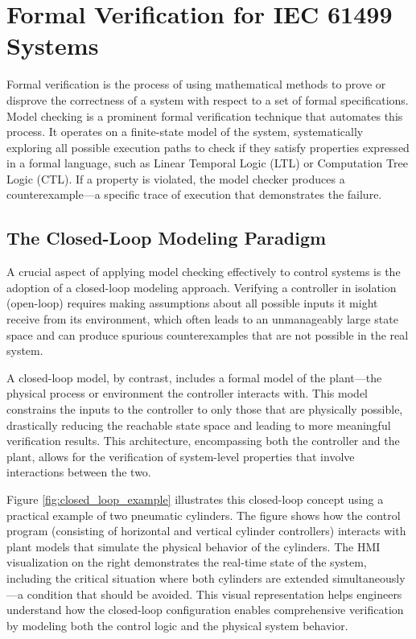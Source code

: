 \section{Formal Verification for IEC 61499 Systems}\label{sec:formal_verification}

Formal verification is the process of using mathematical methods to prove or disprove the correctness of a system with respect to a set of formal specifications. Model checking is a prominent formal verification technique that automates this process. It operates on a finite-state model of the system, systematically exploring all possible execution paths to check if they satisfy properties expressed in a formal language, such as Linear Temporal Logic (LTL) or Computation Tree Logic (CTL). If a property is violated, the model checker produces a counterexample—a specific trace of execution that demonstrates the failure.

\subsection{The Closed-Loop Modeling Paradigm}

A crucial aspect of applying model checking effectively to control systems is the adoption of a closed-loop modeling approach. Verifying a controller in isolation (open-loop) requires making assumptions about all possible inputs it might receive from its environment, which often leads to an unmanageably large state space and can produce spurious counterexamples that are not possible in the real system.

A closed-loop model, by contrast, includes a formal model of the plant—the physical process or environment the controller interacts with. This model constrains the inputs to the controller to only those that are physically possible, drastically reducing the reachable state space and leading to more meaningful verification results. This architecture, encompassing both the controller and the plant, allows for the verification of system-level properties that involve interactions between the two.

Figure \ref{fig:closed_loop_example} illustrates this closed-loop concept using a practical example of two pneumatic cylinders. The figure shows how the control program (consisting of horizontal and vertical cylinder controllers) interacts with plant models that simulate the physical behavior of the cylinders. The HMI visualization on the right demonstrates the real-time state of the system, including the critical situation where both cylinders are extended simultaneously—a condition that should be avoided. This visual representation helps engineers understand how the closed-loop configuration enables comprehensive verification by modeling both the control logic and the physical system behavior.

